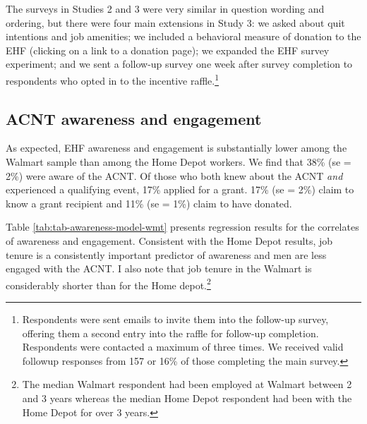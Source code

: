 \documentclass[
  11pt,
  oneside]{article}
\begin{document}
The surveys in Studies 2 and 3 were very similar in question wording and ordering, but there were four main extensions in Study 3: we asked about quit intentions and job amenities; we included a behavioral measure of donation to the EHF (clicking on a link to a donation page); we expanded the EHF survey experiment; and we sent a follow-up survey one week after survey completion to respondents who opted in to the incentive raffle.\footnote{Respondents were sent emails to invite them into the follow-up survey, offering them a second entry into the raffle for follow-up completion. Respondents were contacted a maximum of three times. We received valid followup responses from 157 or 16\% of those completing the main survey.}

\subsection{ACNT awareness and engagement}\label{acnt-awareness-and-engagement}

As expected, EHF awareness and engagement is substantially lower among the Walmart sample than among the Home Depot workers. We find that 38\% (se = 2\%) were aware of the ACNT. Of those who both knew about the ACNT \emph{and} experienced a qualifying event, 17\% applied for a grant. 17\% (se = 2\%) claim to know a grant recipient and 11\% (se = 1\%) claim to have donated.

Table \ref{tab:tab-awareness-model-wmt} presents regression results for the correlates of awareness and engagement. Consistent with the Home Depot results, job tenure is a consistently important predictor of awareness and men are less engaged with the ACNT. I also note that job tenure in the Walmart is considerably shorter than for the Home depot.\footnote{The median Walmart respondent had been employed at Walmart between 2 and 3 years whereas the median Home Depot respondent had been with the Home Depot for over 3 years.}
\end{document}
